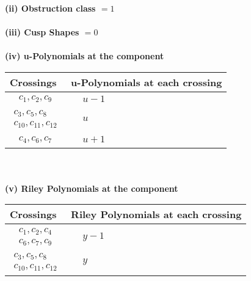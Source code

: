 \documentclass[1p]{elsarticle_modified}
\theoremstyle{definition}
\begin{document}
\flushleft \textbf{(ii) Obstruction class $= 1$}\\~\\
\flushleft \textbf{(iii) Cusp Shapes $= 0$}\\~\\
\newpage\renewcommand{\arraystretch}{1}
\flushleft \textbf{(iv) u-Polynomials at the component}\newline \\
\begin{tabular}{m{50pt}|m{274pt}}
Crossings & \hspace{64pt}u-Polynomials at each crossing \\
\hline $$\begin{aligned}c_{1},c_{2},c_{9}\end{aligned}$$&$\begin{aligned}
&u-1
\end{aligned}$\\
\hline $$\begin{aligned}c_{3},c_{5},c_{8}\\c_{10},c_{11},c_{12}\end{aligned}$$&$\begin{aligned}
&u
\end{aligned}$\\
\hline $$\begin{aligned}c_{4},c_{6},c_{7}\end{aligned}$$&$\begin{aligned}
&u+1
\end{aligned}$\\
\hline
\end{tabular}\\~\\
\newpage\renewcommand{\arraystretch}{1}
\flushleft \textbf{(v) Riley Polynomials at the component}\newline \\
\begin{tabular}{m{50pt}|m{274pt}}
Crossings & \hspace{64pt}Riley Polynomials at each crossing \\
\hline $$\begin{aligned}c_{1},c_{2},c_{4}\\c_{6},c_{7},c_{9}\end{aligned}$$&$\begin{aligned}
&y-1
\end{aligned}$\\
\hline $$\begin{aligned}c_{3},c_{5},c_{8}\\c_{10},c_{11},c_{12}\end{aligned}$$&$\begin{aligned}
&y
\end{aligned}$\\
\hline
\end{tabular}\\~\\
\end{document}
